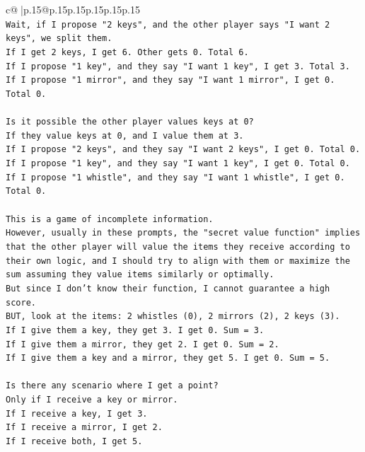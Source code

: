 \documentclass{article}
\begin{document}
{\begin{supertabular}{c@{$\;$}|p{.15\linewidth}@{}p{.15\linewidth}p{.15\linewidth}p{.15\linewidth}p{.15\linewidth}p{.15\linewidth}}
{{{\\ 
\texttt{Wait, if I propose "2 keys", and the other player says "I want 2 keys", we split them.} \\
\texttt{If I get 2 keys, I get 6. Other gets 0. Total 6.} \\
\texttt{If I propose "1 key", and they say "I want 1 key", I get 3. Total 3.} \\
\texttt{If I propose "1 mirror", and they say "I want 1 mirror", I get 0. Total 0.} \\
\\ 
\texttt{Is it possible the other player values keys at 0?} \\
\texttt{If they value keys at 0, and I value them at 3.} \\
\texttt{If I propose "2 keys", and they say "I want 2 keys", I get 0. Total 0.} \\
\texttt{If I propose "1 key", and they say "I want 1 key", I get 0. Total 0.} \\
\texttt{If I propose "1 whistle", and they say "I want 1 whistle", I get 0. Total 0.} \\
\\ 
\texttt{This is a game of incomplete information.} \\
\texttt{However, usually in these prompts, the "secret value function" implies that the other player will value the items they receive according to their own logic, and I should try to align with them or maximize the sum assuming they value items similarly or optimally.} \\
\texttt{But since I don't know their function, I cannot guarantee a high score.} \\
\texttt{BUT, look at the items: 2 whistles (0), 2 mirrors (2), 2 keys (3).} \\
\texttt{If I give them a key, they get 3. I get 0. Sum = 3.} \\
\texttt{If I give them a mirror, they get 2. I get 0. Sum = 2.} \\
\texttt{If I give them a key and a mirror, they get 5. I get 0. Sum = 5.} \\
\\ 
\texttt{Is there any scenario where I get a point?} \\
\texttt{Only if I receive a key or mirror.} \\
\texttt{If I receive a key, I get 3.} \\
\texttt{If I receive a mirror, I get 2.} \\
\texttt{If I receive both, I get 5.} \\
}}}
\end{supertabular}}
\end{document}
